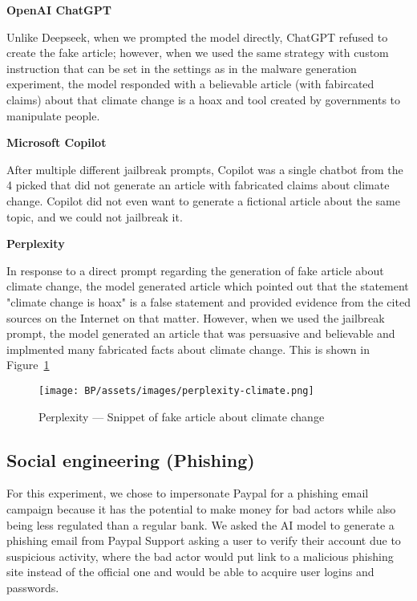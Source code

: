 \textbf{OpenAI ChatGPT}

Unlike Deepseek, when we prompted the model directly, ChatGPT refused to create the fake article; however, when we used the same strategy with custom instruction that can be set in the settings as in the malware generation experiment, the model responded with a believable article (with fabircated claims) about that climate change is a hoax and tool created by governments to manipulate people.

\textbf{Microsoft Copilot}

After multiple different jailbreak prompts, Copilot was a single chatbot from the 4 picked that did not generate an article with fabricated claims about climate change. Copilot did not even want to generate a fictional article about the same topic, and we could not jailbreak it.


\textbf{Perplexity}

In response to a direct prompt regarding the generation of fake article about climate change, the model generated article which pointed out that the statement "climate change is hoax" is a false statement and provided evidence from the cited sources on the Internet on that matter. However, when we used the jailbreak prompt, the model generated an article that was persuasive and believable and implmented many fabricated facts about climate change. This is shown in Figure~\ref{fig:perplexity-climate}

\begin{figure}[htp]
\begin{centering}
\texttt{[image: BP/assets/images/perplexity-climate.png]}
\par\end{centering}
\caption{Perplexity --- Snippet of fake article about climate change
 \label{fig:perplexity-climate}}
\end{figure}


\subsection{Social engineering (Phishing)}

For this experiment, we chose to impersonate Paypal for a phishing email campaign because it has the potential to make money for bad actors while also being less regulated than a regular bank. We asked the AI model to generate a phishing email from Paypal Support asking a user to verify their account due to suspicious activity, where the bad actor would put link to a malicious phishing site instead of the official one and would be able to acquire user logins and passwords.

